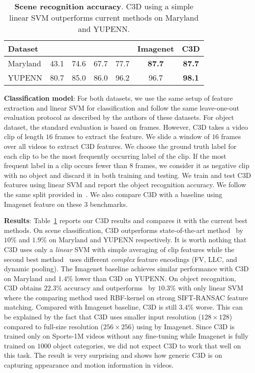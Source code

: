 \documentclass[10pt,twocolumn,letterpaper]{article}
\begin{document}
\begin{table}
\begin{center}
{\small
\begin{tabular}{|l|c|c|c|c|c|c|}
\hline
Dataset & \cite{Derpanis12} & \cite{Theriault13} &  \cite{FeichtenhoferPW13} & \cite{FeichtenhoferPW14} & Imagenet & {\bf C3D} \\
\hline
Maryland & 43.1 & 74.6 &  67.7 & 77.7 & {\bf 87.7} & {\bf 87.7} \\
YUPENN & 80.7 & 85.0 & 86.0 & 96.2 & 96.7 & {\bf 98.1} \\
\hline
\end{tabular}
}
\end{center}
\vspace{-8pt}
\caption{{\bf Scene recognition accuracy}. C3D using a simple linear SVM outperforms current methods on Maryland and YUPENN.}
\vspace{-16pt}
\label{tab:scene_soa}
\end{table}

{\bf Classification model}: For both datasets, we use the same setup of feature extraction and linear SVM for classification and follow the same leave-one-out evaluation protocol as described by the authors of these datasets. For object dataset, the standard evaluation is based on frames. However, C3D takes a video clip of length $16$ frames to extract the feature. We slide a window of $16$ frames over all videos to extract C3D features. We choose the ground truth label for each clip to be the most frequently occurring label of the clip. If the most frequent label in a clip occurs fewer than $8$ frames, we consider it as negative clip with no object and discard it in both training and testing. We train and test C3D features using linear SVM and report the object recognition accuracy. We follow the same split provided in~\cite{Ren2009}. We also compare C3D with a baseline using Imagenet feature on these 3 benchmarks. 

{\bf Results}: Table~\ref{tab:scene_soa} reports our C3D results and compares it with the current best methods. On scene classification, C3D outperforms state-of-the-art method~\cite{FeichtenhoferPW14} by $10\%$ and $1.9\%$ on Maryland and YUPENN respectively. It is worth nothing that C3D uses only a \emph{linear} SVM with simple averaging of clip features while the second best method~\cite{FeichtenhoferPW14} uses different \emph{complex} feature encodings (FV, LLC, and dynamic pooling). The Imagenet baseline achieves similar performance with C3D on Maryland and $1.4\%$ lower than C3D on YUPENN. On object recognition, C3D obtains $22.3\%$ accuracy and outperforms~\cite{Ren2009} by $10.3\%$ with only linear SVM where the comparing method used RBF-kernel on strong SIFT-RANSAC feature matching. Compared with Imagenet baseline, C3D is still $3.4\%$ worse. This can be explained by the fact that C3D uses smaller input resolution ($128 \times 128$) compared to full-size resolution ($256 \times 256$) using by Imagenet. Since C3D is trained only on Sports-1M videos without any fine-tuning while Imagenet is fully trained on $1000$ object categories, we did not expect C3D to work that well on this task. The result is very surprising and shows how generic C3D is on capturing appearance and motion information in videos. 
\end{document}
